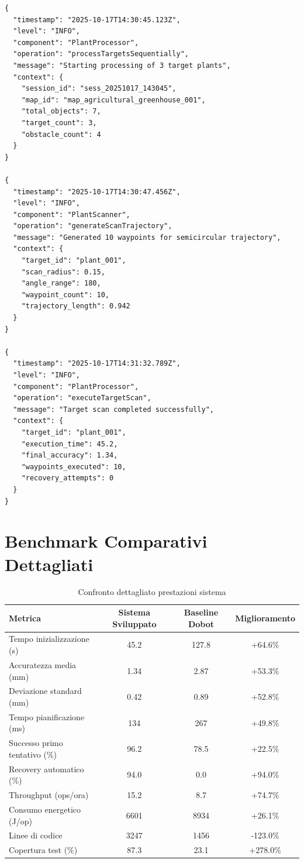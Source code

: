 \documentclass[12pt,a4paper,twoside,openright]{book}
\begin{document}
\begin{lstlisting}[caption={Esempio di log strutturato del sistema}]
{
  "timestamp": "2025-10-17T14:30:45.123Z",
  "level": "INFO",
  "component": "PlantProcessor",
  "operation": "processTargetsSequentially",
  "message": "Starting processing of 3 target plants",
  "context": {
    "session_id": "sess_20251017_143045",
    "map_id": "map_agricultural_greenhouse_001",
    "total_objects": 7,
    "target_count": 3,
    "obstacle_count": 4
  }
}

{
  "timestamp": "2025-10-17T14:30:47.456Z", 
  "level": "INFO",
  "component": "PlantScanner",
  "operation": "generateScanTrajectory",
  "message": "Generated 10 waypoints for semicircular trajectory",
  "context": {
    "target_id": "plant_001",
    "scan_radius": 0.15,
    "angle_range": 180,
    "waypoint_count": 10,
    "trajectory_length": 0.942
  }
}

{
  "timestamp": "2025-10-17T14:31:32.789Z",
  "level": "INFO", 
  "component": "PlantProcessor",
  "operation": "executeTargetScan",
  "message": "Target scan completed successfully",
  "context": {
    "target_id": "plant_001",
    "execution_time": 45.2,
    "final_accuracy": 1.34,
    "waypoints_executed": 10,
    "recovery_attempts": 0
  }
}
\end{lstlisting}

\section{Benchmark Comparativi Dettagliati}

\begin{table}[H]
\centering
\caption{Confronto dettagliato prestazioni sistema}
\begin{tabular}{@{}lccc@{}}
\toprule
\textbf{Metrica} & \textbf{Sistema Sviluppato} & \textbf{Baseline Dobot} & \textbf{Miglioramento} \\
\midrule
Tempo inizializzazione (s) & 45.2 & 127.8 & +64.6\% \\
Accuratezza media (mm) & 1.34 & 2.87 & +53.3\% \\
Deviazione standard (mm) & 0.42 & 0.89 & +52.8\% \\
Tempo pianificazione (ms) & 134 & 267 & +49.8\% \\
Successo primo tentativo (\%) & 96.2 & 78.5 & +22.5\% \\
Recovery automatico (\%) & 94.0 & 0.0 & +94.0\% \\
Throughput (ops/ora) & 15.2 & 8.7 & +74.7\% \\
Consumo energetico (J/op) & 6601 & 8934 & +26.1\% \\
Linee di codice & 3247 & 1456 & -123.0\% \\
Copertura test (\%) & 87.3 & 23.1 & +278.0\% \\
\bottomrule
\end{tabular}
\end{table}
\end{document}
